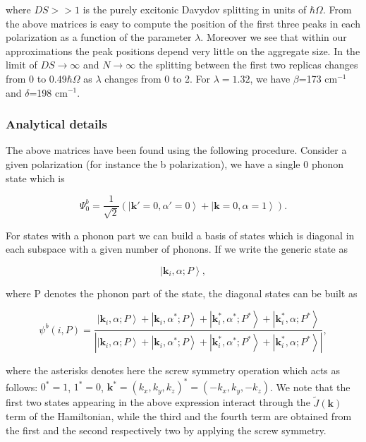 \documentclass[pt12]{article}
\newcommand{\bfk}{\mathbf{k}}
\begin{document}
where $DS>>1$ is the purely excitonic Davydov splitting in units of
$\hbar\Omega$. From the above matrices is easy to compute the
position of the first three peaks in each polarization as a function
of the parameter $\lambda$. Moreover we see that within our
approximations the peak positions depend very little on the
aggregate size. In the limit of $DS\rightarrow \infty$ and
$N\rightarrow \infty$ the splitting between the first two replicas
changes from 0 to 0.49$\hbar\Omega$ as $\lambda$ changes from 0 to
2. For $\lambda=1.32$, we have $\beta$=173 cm$^{-1}$ and
$\delta$=198 cm$^{-1}$.

\subsubsection{Analytical details}

The above matrices have been found using the following procedure.
Consider a given polarization (for instance the b polarization), we
have a single 0 phonon state which is

\begin{equation}
\Psi^b_0=\frac{1}{\sqrt{2}}\left(
\left|\bfk'=0,\alpha'=0\right>+\left|\bfk=0,\alpha=1 \right>
\right).
\end{equation}

For states with a phonon part we can build a basis of states which
is diagonal in each subspace with a given number of phonons. If we
write the generic state as

\begin{equation}
\left|\bfk_i,\alpha; P \right>,
\end{equation}

where P denotes the phonon part of the state, the diagonal states
can be built as

\begin{equation}\label{diag_state}
\psi^b(i,P)=\frac{ \left|\bfk_i,\alpha; P
\right>+\left|\bfk_i,\alpha^*; P \right>+\left|\bfk_i^*,\alpha^*;
P^* \right>+\left|\bfk_i^*,\alpha; P^* \right>
}{|\left|\bfk_i,\alpha; P \right>+\left|\bfk_i,\alpha^*; P
\right>+\left|\bfk_i^*,\alpha^*; P^* \right>+\left|\bfk_i^*,\alpha;
P^* \right>  |} ,
\end{equation}

where the asterisks denotes here the screw symmetry operation which
acts as follows: $0^*=1$, $1^*=0$,
$\bfk^*=(k_x,k_y,k_z)^*=(-k_x,k_y,-k_z)$. We note that the first two
states appearing in the above expression interact through the
$\tilde{J}(\bfk)$ term of the Hamiltonian, while the third and the
fourth term are obtained from the first and the second respectively
two by applying the screw symmetry.
\end{document}
